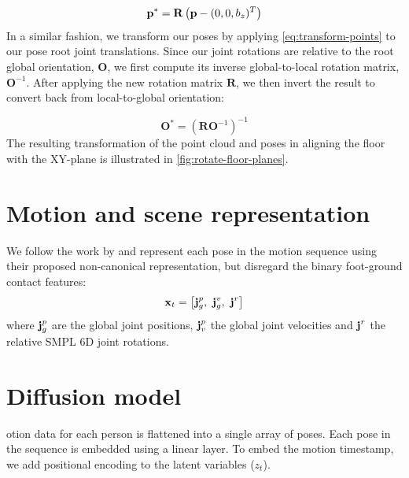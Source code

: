 \begin{equation} \label{eq:transform-points}
    \boldsymbol{\mathbf{p}}^* = \mathbf{R} \left(\boldsymbol{\mathbf{p}} - (0, 0, b_z)^T \right) 
\end{equation}
In a similar fashion, we transform our poses by applying \cref{eq:transform-points} to our pose root joint translations. Since our joint rotations are relative to the root global orientation, $\mathbf{O}$, we first compute its inverse global-to-local rotation matrix, $\mathbf{O}^{-1}$. After applying the new rotation matrix $\mathbf{R}$, we then invert the result to convert back from local-to-global orientation:

\begin{equation}
    \mathbf{O}^* = \left(\mathbf{R} \mathbf{O}^{-1} \right)^{-1}
\end{equation}
The resulting transformation of the point cloud and poses in aligning the floor with the XY-plane is illustrated in \cref{fig:rotate-floor-planes}.

\section{Motion and scene representation}
We follow the work by \cite{liang2024intergen} and represent each pose in the motion sequence using their proposed non-canonical representation, but disregard the binary foot-ground contact features:
\begin{equation}
    \vect{x}_t = \left[\vect{j}_g^p,\ \vect{j}_g^v,\ \vect{j}^r \right]
\end{equation}
where $\boldsymbol{\mathbf{j}}_g^p$ are the global joint positions, $\boldsymbol{\mathbf{j}}_v^p$ the global joint velocities and $\boldsymbol{\mathbf{j}}^r$ the relative SMPL 6D joint rotations.





\section{Diffusion model}


otion data for each person is flattened into a single array of poses. Each pose in the sequence is embedded using a linear layer. To embed the motion timestamp, we add positional encoding to the latent variables ($z_t$).

